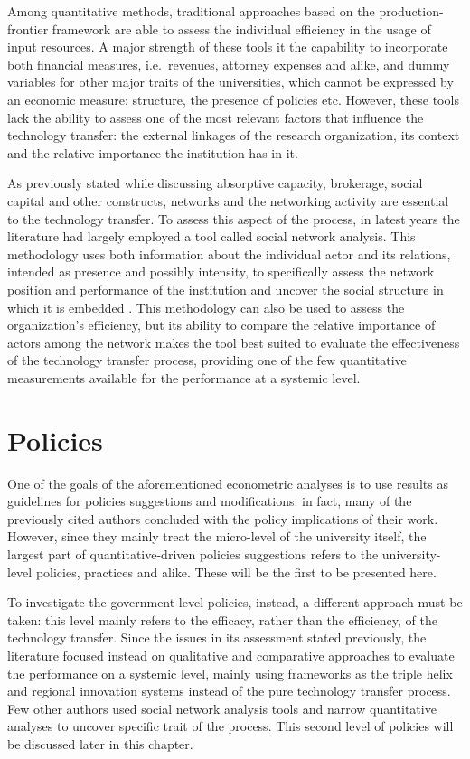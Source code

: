 Among quantitative methods, traditional approaches based on the production-frontier framework are able to assess the individual efficiency in the usage of input resources. A major strength of these tools it the capability to incorporate both financial measures, i.e.\ revenues, attorney expenses and alike, and dummy variables for other major traits of the universities, which cannot be expressed by an economic measure: structure, the presence of policies etc. However, these tools lack the ability to assess one of the most relevant factors that influence the technology transfer: the external linkages of the research organization, its context and the relative importance the institution has in it. 

As previously stated while discussing absorptive capacity, brokerage, social capital and other constructs, networks and the networking activity are essential to the technology transfer. To assess this aspect of the process, in latest years the literature had largely employed a tool called social network analysis. This methodology uses both information about the individual actor and its relations, intended as presence and possibly intensity, to specifically assess the network position and performance of the institution and uncover the social structure in which it is embedded \citep{Pinheiro2015}. This methodology can also be used to assess the organization's efficiency, but its ability to compare the relative importance of actors among the network makes the tool best suited to evaluate the effectiveness of the technology transfer process, providing one of the few quantitative measurements available for the performance at a systemic level.

\section{Policies}

One of the goals of the aforementioned econometric analyses is to use results as guidelines for policies suggestions and modifications: in fact, many of the previously cited authors concluded with the policy implications of their work. However, since they mainly treat the micro-level of the university itself, the largest part of quantitative-driven policies suggestions refers to the university-level policies, practices and alike. These will be the first to be presented here.

To investigate the government-level policies, instead, a different approach must be taken: this level mainly refers to the efficacy, rather than the efficiency, of the technology transfer. Since the issues in its assessment stated previously, the literature focused instead on qualitative and comparative approaches to evaluate the performance on a systemic level, mainly using frameworks as the triple helix and regional innovation systems instead of the pure technology transfer process. Few other authors used social network analysis tools and narrow quantitative analyses to uncover specific trait of the process. This second level of policies will be discussed later in this chapter.

